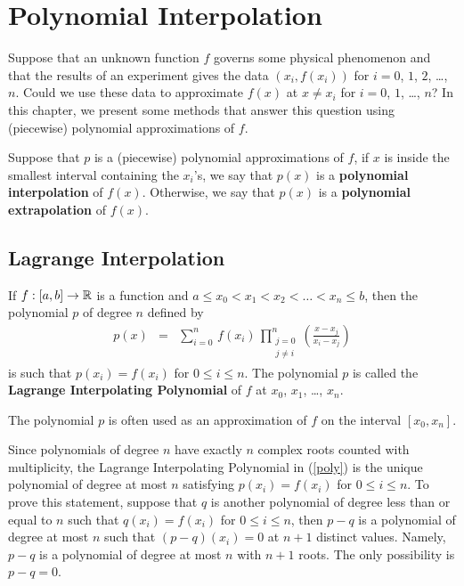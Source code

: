 \chapter{Polynomial Interpolation}\label{chaptInterA}

Suppose that an unknown function $f$ governs some physical phenomenon
and that the results of an experiment gives the data $(x_i,f(x_i))$
for $i=0$, $1$, $2$, \ldots, $n$.  Could we use these data to
approximate $f(x)$ at $x \neq x_i$ for $i=0$, $1$, \ldots, $n$?
In this chapter, we present some methods that answer this question
using (piecewise) polynomial approximations of $f$.

\begin{defn}
Suppose that $p$ is a (piecewise) polynomial approximations of $f$, if $x$ is
inside the smallest interval containing the $x_i$'s, we say that
$p(x)$ is a
{\bfseries polynomial interpolation}
of $f(x)$. Otherwise, we say that $p(x)$ is a
{\bfseries polynomial extrapolation}
of $f(x)$.
\end{defn}

\section{Lagrange Interpolation}

\begin{defn}
If $f:[a,b] \rightarrow \mathbb{R}$ is a function and
$a \leq x_0 < x_1 < x_2 < \ldots < x_n \leq b$, then the polynomial $p$ 
of degree $n$ defined by
\begin{eqnarray}\label{poly}
p(x) & = &
\sum_{i=0}^n\,f(x_i)\,\prod_{\substack{j=0\\j\neq i}}^n \left(
\frac{x-x_j}{x_i-x_j} \right)
\end{eqnarray}
is such that $p(x_i) = f(x_i)$ for $0 \leq i \leq n$.  The polynomial
$p$ is called the
{\bfseries Lagrange Interpolating Polynomial} of $f$ 
at $x_0$, $x_1$, \ldots, $x_n$.
\end{defn}

The polynomial $p$ is often used as
an approximation of $f$ on the interval $[x_0,x_n]$.

Since polynomials of degree $n$ have exactly $n$ complex roots
counted with multiplicity, the Lagrange Interpolating Polynomial in
(\ref{poly}) is the unique polynomial of degree at most $n$ satisfying
$p(x_i) = f(x_i)$ for $0 \leq i \leq n$.  To prove this statement,
suppose that $q$ is another polynomial of degree less than or equal to
$n$ such that $q(x_i) = f(x_i)$ for $0 \leq i \leq n$, then $p-q$ is a
polynomial of degree at most $n$ such that $(p-q)(x_i) = 0$ at $n+1$
distinct values.  Namely, $p-q$ is a polynomial of degree at most $n$
with $n+1$ roots.  The only possibility is $p - q = 0$.

